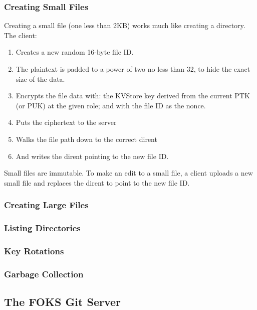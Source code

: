 \subsubsection{Creating Small Files}

Creating a small file (one less than 2KB) works much like creating a directory. The client:
%
\begin{enumerate}
    \item Creates a new random 16-byte file ID. 
    \item The plaintext is padded to a power of two no less than 32, to hide the exact size of the data.
    \item Encrypts the file data with: the KVStore key derived from the 
         current PTK (or PUK) at the given role; and with the file ID as the nonce.
    \item Puts the ciphertext to the server
    \item Walks the file path down to the correct dirent
    \item And writes the dirent pointing to the new file ID.
\end{enumerate}
%
Small files are immutable. To make an edit to a small file, a client uploads a new 
small file and replaces the dirent to point to the new file ID.


\subsubsection{Creating Large Files}

\subsubsection{Listing Directories}

\subsubsection{Key Rotations}

\subsubsection{Garbage Collection}

\subsection{The FOKS Git Server}
